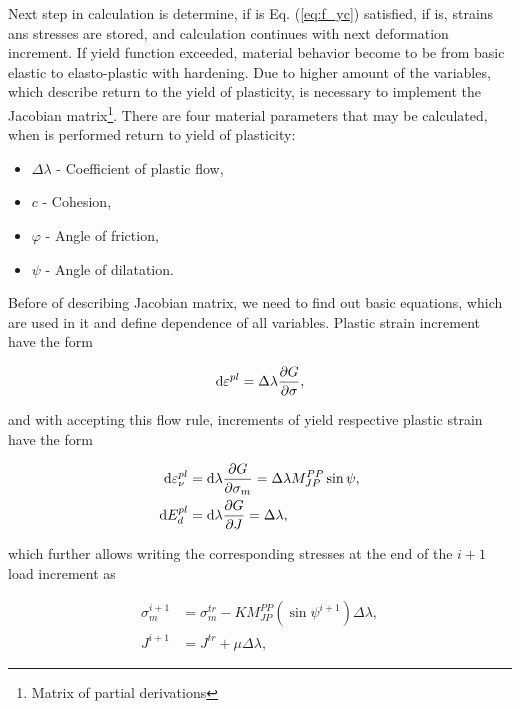 Next step in calculation is determine, if is Eq. (\ref{eq:f_yc}) satisfied, if is, strains ans stresses are stored, and calculation continues with next deformation increment. If yield function exceeded, material behavior become to be from basic elastic to elasto-plastic with hardening. Due to higher amount of the variables, which describe return to the yield of plasticity, is necessary to implement the Jacobian matrix\footnote{Matrix of partial derivations}. There are four material parameters that may be calculated, when is performed return to yield of plasticity:

\begin{itemize}
	\item $\Delta\lambda$ - Coefficient of plastic flow,
	\item $c$ - Cohesion,
	\item  $\varphi$ - Angle of friction,
	\item $\psi$ - Angle of dilatation.
\end{itemize}

Before of describing Jacobian matrix, we need to find out basic equations, which are used in it and define dependence of all variables. 
Plastic strain increment have the form 

\begin{equation}
	\dd \varepsilon^{pl} = \Delta \lambda \pdv{G}{\sigma},
\end{equation}

and with accepting this flow rule, increments of yield respective plastic strain have the form 

\begin{align}
	\dd \varepsilon_\nu^{pl} &= \dd \lambda \pdv{G}{\sigma_m} = \Delta \lambda M_{JP}^{PP} \sin \psi,\\
	\dd E_{d}^{pl} &= \dd \lambda \pdv{G}{J} = \Delta \lambda,
\end{align}

which further allows writing the corresponding stresses at the end of the $i+1$ load increment as  

\begin{align}
	\sigma_m^{i+1} &= \sigma_m^{tr} - K M_{JP}^{PP} (\sin \psi^{i+1}) \Delta \lambda,\\
	J^{i+1} &= J^{tr} + \mu \Delta \lambda,
\end{align}

